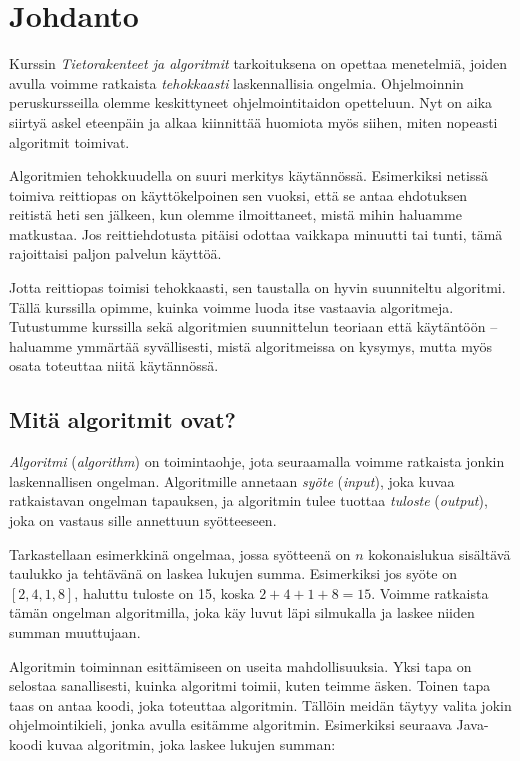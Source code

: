 \chapter{Johdanto}

Kurssin \emph{Tietorakenteet ja algoritmit} tarkoituksena
on opettaa menetelmiä, joiden avulla voimme ratkaista
\emph{tehokkaasti} laskennallisia ongelmia.
Ohjelmoinnin peruskursseilla olemme keskittyneet
ohjelmointitaidon opetteluun.
Nyt on aika siirtyä askel eteenpäin ja alkaa kiinnittää
huomiota myös siihen, miten nopeasti algoritmit toimivat.

Algoritmien tehokkuudella on suuri merkitys käytännössä.
Esimerkiksi netissä toimiva reittiopas on käyttökelpoinen sen vuoksi,
että se antaa ehdotuksen reitistä heti sen jälkeen, kun olemme
ilmoittaneet, mistä mihin haluamme matkustaa.
Jos reittiehdotusta pitäisi odottaa vaikkapa minuutti tai tunti,
tämä rajoittaisi paljon palvelun käyttöä.

Jotta reittiopas toimisi tehokkaasti, sen taustalla on
hyvin suunniteltu algoritmi.
Tällä kurssilla opimme, kuinka voimme luoda itse vastaavia algoritmeja.
Tutustumme kurssilla sekä algoritmien suunnittelun teoriaan että
käytäntöön -- haluamme ymmärtää syvällisesti, mistä algoritmeissa on kysymys,
mutta myös osata toteuttaa niitä käytännössä.

\section{Mitä algoritmit ovat?}


\emph{Algoritmi} (\emph{algorithm}) on toimintaohje, jota seuraamalla voimme ratkaista
jonkin laskennallisen ongelman.
Algoritmille annetaan \emph{syöte} (\emph{input}),
joka kuvaa ratkaistavan ongelman tapauksen,
ja algoritmin tulee tuottaa \emph{tuloste} (\emph{output}),
joka on vastaus sille annettuun syötteeseen.

Tarkastellaan esimerkkinä ongelmaa,
jossa syötteenä on $n$ kokonaislukua sisältävä taulukko ja
tehtävänä on laskea lukujen summa.
Esimerkiksi jos syöte on $[2,4,1,8]$,
haluttu tuloste on 15, koska $2+4+1+8=15$.
Voimme ratkaista tämän ongelman algoritmilla,
joka käy luvut läpi silmukalla ja laskee niiden
summan muuttujaan.

Algoritmin toiminnan esittämiseen on useita mahdollisuuksia.
Yksi tapa on selostaa sanallisesti, kuinka algoritmi toimii,
kuten teimme äsken.
Toinen tapa taas on antaa koodi, joka toteuttaa algoritmin.
Tällöin meidän täytyy valita jokin ohjelmointikieli,
jonka avulla esitämme algoritmin.
Esimerkiksi seuraava Java-koodi kuvaa algoritmin,
joka laskee lukujen summan:

